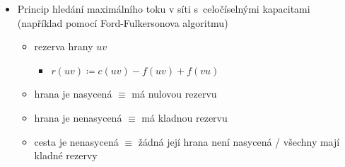 \begin{itemize}
\begin{itemize}
\item velikost toku $f$ v síti $(V,E,z,s,c)$ je $w(f)\coloneqq f[\text{Out}(z)]-f[\text{In}(z)]$
\item kde $\mathrm{Out}(z)$ a $\mathrm{In}(z)$ jsou množiny hran do, respektive ze zdroje a $f[A]\coloneqq\sum_{e\in A}f(e)$ pro $A\subseteq E$
\item maximální tok je tok, který má největší velikost
\item fakt: v každé tokové síti existuje maximální tok
\item poznámka: obecně na přednášce uvažujeme konečné tokové sítě, grafy apod.
\item idea důkazu
\begin{itemize}
\item mějme síť, očíslujme hrany (od $1$ do $m$)
\item tok $f$ reprezentujme jako uspořádanou $m$-tici hodnot
\item množina všech toků je uzavřená a omezená podmnožina $\mathbb R^m$, je tedy kompaktní
\item funkce, která toku $f$ přiřadí $w(f)$, je spojitá
\item víme z analýzy, že spojitá funkce na kompaktní množině nabývá maxima
\end{itemize}
\item řez v síti $(V,E,z,s,c)$ je množina hran $R\subseteq E$ taková, že každá orientovaná cesta ze $z$ do $s$ obsahuje aspoň jednu hranu $R$
\item Minimaxová věta o toku a řezu: nechť $f_\text{max}$ je maximální tok a $R_\text{min}$ je minimální řez v $(V,E,z,s,c)$, potom $w(f_\text{max})=c(R_\text{min})$
\end{itemize}
\item Princip hledání maximálního toku v síti s~celočíselnými kapacitami (například pomocí Ford-Fulkersonova algoritmu)
\begin{itemize}
\item rezerva hrany $uv$
\begin{itemize}
\item $r(uv)\coloneqq c(uv)-f(uv)+f(vu)$
\end{itemize}
\item hrana je nasycená $\equiv$ má nulovou rezervu
\item hrana je nenasycená $\equiv$ má kladnou rezervu
\item cesta je nenasycená $\equiv$ žádná její hrana není nasycená / všechny mají kladné rezervy

\end{itemize}
\end{itemize}
